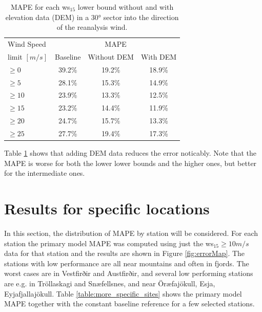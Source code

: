 \begin{table}[h]
  \caption[Model results for different wind speed limits]{MAPE for each ws$_{15}$ lower bound without and with elevation data (DEM) in a 30° sector into the direction of the reanalysis wind.}
  \label{table:results}
  \centering
  \begin{tabular}{lccc}
      \toprule
      Wind Speed & \multicolumn{3}{c}{MAPE} \\
      limit $[m/s]$ & Baseline & Without DEM & With DEM \\
      \midrule
      $\geq 0$ & 39.2\% & 19.2\% & 18.9\% \\
      $\geq 5$ & 28.1\% & 15.3\% & 14.9\%\\
      $\geq 10$ & 23.9\% & 13.3\% & 12.5\%\\
      $\geq 15$ & 23.2\% & 14.4\% & 11.9\%\\
      $\geq 20$ & 24.7\% & 15.7\% & 13.3\%\\
      $\geq 25$ & 27.7\% & 19.4\% & 17.3\%\\
      \bottomrule
  \end{tabular}
\end{table}

Table \ref{table:results} shows that adding DEM data reduces the error noticably. Note that the MAPE is worse for both the lower lower bounds and the higher ones, but better for the intermediate ones.

\section{Results for specific locations}
In this section, the distribution of MAPE by station will be considered. For each station the primary model MAPE was computed using just the ws$_{15} \geq 10 m/s$ data for that station and the results are shown in Figure \ref{fig:errorMap}. The stations with low performance are all near mountains and often in fjords. The worst cases are in Vestfirðir and Austfirðir, and several low performing stations are e.g. in Tröllaskagi and Snæfellsnes, and near Öræfajökull, Esja, Eyjafjallajökull. Table \ref{table:more_specific_sites} shows the primary model MAPE together with the constant baseline reference for a few selected stations.

